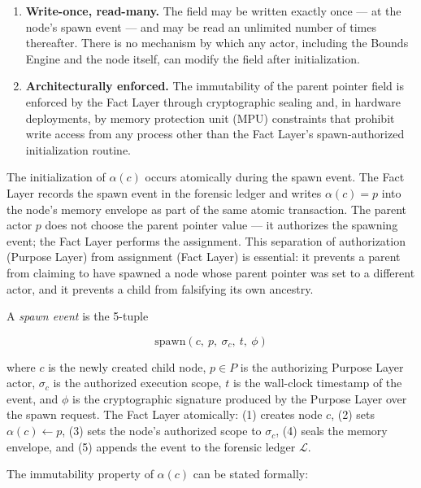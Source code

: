 \begin{enumerate}
    \item \textbf{Write-once, read-many.} The field may be written exactly once — at the node's spawn event — and may be read an unlimited number of times thereafter. There is no mechanism by which any actor, including the Bounds Engine and the node itself, can modify the field after initialization.

    \item \textbf{Architecturally enforced.} The immutability of the parent pointer field is enforced by the Fact Layer through cryptographic sealing and, in hardware deployments, by memory protection unit (MPU) constraints that prohibit write access from any process other than the Fact Layer's spawn-authorized initialization routine.
\end{enumerate}

The initialization of $\alpha(c)$ occurs atomically during the spawn event. The Fact Layer records the spawn event in the forensic ledger and writes $\alpha(c) = p$ into the node's memory envelope as part of the same atomic transaction. The parent actor $p$ does not choose the parent pointer value — it authorizes the spawning event; the Fact Layer performs the assignment. This separation of authorization (Purpose Layer) from assignment (Fact Layer) is essential: it prevents a parent from claiming to have spawned a node whose parent pointer was set to a different actor, and it prevents a child from falsifying its own ancestry.

\begin{dfn}
\label{dfn:spawn-event}
A \emph{spawn event} is the 5-tuple

\begin{equation}
\mathrm{spawn}(c,\ p,\ \sigma_c,\ t,\ \phi)
\end{equation}

where $c$ is the newly created child node, $p \in P$ is the authorizing Purpose Layer actor, $\sigma_c$ is the authorized execution scope, $t$ is the wall-clock timestamp of the event, and $\phi$ is the cryptographic signature produced by the Purpose Layer over the spawn request. The Fact Layer atomically: (1) creates node $c$, (2) sets $\alpha(c) \leftarrow p$, (3) sets the node's authorized scope to $\sigma_c$, (4) seals the memory envelope, and (5) appends the event to the forensic ledger $\mathcal{L}$.
\end{dfn}

The immutability property of $\alpha(c)$ can be stated formally:

